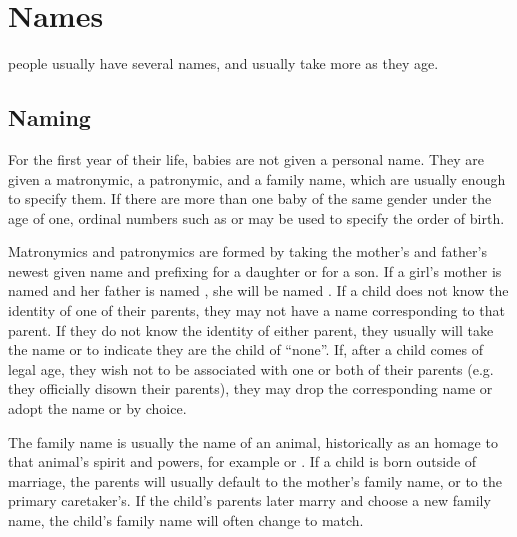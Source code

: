 \chapter{Names}
\label{app:names}

\lang{} people usually have several names, and usually take more as they age.

\section{Naming}
\label{sec:naming}

For the first year of their life, babies are not given a personal name. They are given a matronymic, a patronymic, and a family name, which are usually enough to specify them. If there are more than one baby of the same gender under the age of one, ordinal numbers such as    or    may be used to specify the order of birth.


Matronymics and patronymics are formed by taking the mother's and father's newest given name and prefixing  for a daughter or  for a son. If a girl's mother is named  and her father is named , she will be named  . If a child does not know the identity of one of their parents, they may not have a name corresponding to that parent. If they do not know the identity of either parent, they usually will take the name  or  to indicate they are the child of \enquote{none}. If, after a child comes of legal age, they wish not to be associated with one or both of their parents (e.g. they officially disown their parents), they may drop the corresponding name or adopt the name  or  by choice.



The family name is usually the name of an animal, historically as an homage to that animal's spirit and powers, for example    or   . If a child is born outside of marriage, the parents will usually default to the mother's family name, or to the primary caretaker's. If the child's parents later marry and choose a new family name, the child's family name will often change to match.

